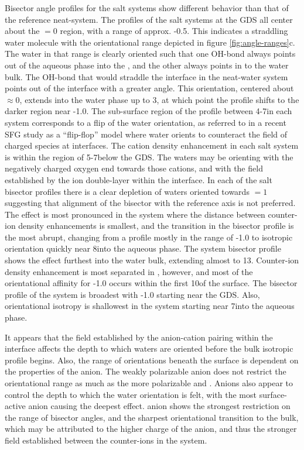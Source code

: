 Bisector angle profiles for the salt systems show different behavior than that of the reference neat-\wat system. The profiles of the salt systems at the GDS all center about the \costheta$=0$ region, with a range of approx. -0.5. This indicates a straddling water molecule with the orientational range depicted in figure \ref{fig:angle-ranges}c. The water in that range is clearly oriented such that one OH-bond always points out of the aqueous phase into the \ctc, and the other always points in to the water bulk. The OH-bond that would straddle the interface in the neat-water system points out of the interface with a greater angle. This orientation, centered about \costheta$\approx 0$, extends into the water phase up to 3\angs, at which point the profile shifts to the darker region near -1.0. The sub-surface region of the profile between 4-7\angs in each system corresponds to a flip of the water orientation, as referred to in a recent SFG study as a ``flip-flop'' model where water orients to counteract the field of charged species at interfaces.\cite{Nihonyanagi2009} The cation density enhancement in each salt system is within the region of 5-7\angs below the GDS. The waters may be orienting with the negatively charged oxygen end towards those cations, and with the field established by the ion double-layer within the interface. In each of the salt bisector profiles there is a clear depletion of waters oriented towards \costheta$=1$ suggesting that alignment of the bisector with the reference axis is not preferred. The effect is most pronounced in the \sodsul system where the distance between counter-ion density enhancements is smallest, and the transition in the bisector profile is the most abrupt, changing from a profile mostly in the range of -1.0 to isotropic orientation quickly near 8\angs into the aqueous phase. The \sodnit system bisector profile shows the effect furthest into the water bulk, extending almost to 13\angs. Counter-ion density enhancement is most separated in \sodnit, however, and most of the orientational affinity for -1.0 occurs within the first 10\angs of the surface. The bisector profile of the \nacl system is broadest with -1.0 starting near the GDS. Also, orientational isotropy is shallowest in the \nacl system starting near 7\angs into the aqueous phase.

It appears that the field established by the anion-cation pairing within the interface affects the depth to which waters are oriented before the bulk isotropic profile begins. Also, the range of orientations beneath the surface is dependent on the properties of the anion. The weakly polarizable \cl anion does not restrict the orientational range as much as the more polarizable \nit and \sul. Anions also appear to control the depth to which the water orientation is felt, with the most surface-active \nit anion causing the deepest effect. \sul anion shows the strongest restriction on the range of bisector angles, and the sharpest orientational transition to the bulk, which may be attributed to the higher charge of the anion, and thus the stronger field established between the counter-ions in the system.

